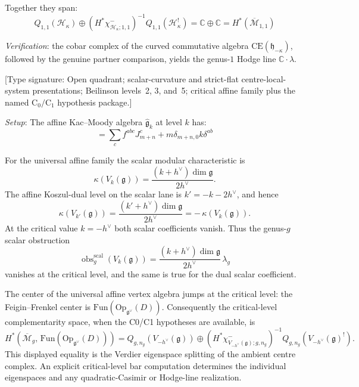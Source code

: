\begin{example}
Together they span:
\begin{equation}
Q_{1,1}(\mathcal{H}_\kappa)\oplus
(H^*\chi^-_{\mathcal H_\kappa;1,1})^{-1}
Q_{1,1}(\mathcal{H}_\kappa^!)=\mathbb{C}\oplus\mathbb{C}
= H^*(\overline{\mathcal{M}}_{1,1})
\end{equation}

\emph{Verification}: the cobar complex of the curved commutative
algebra $\mathrm{CE}(\mathfrak h_{-\kappa})$, followed by the genuine
partner comparison, yields the genus-$1$ Hodge line
$\mathbb C\cdot\lambda$.
\end{example}

\begin{example}
\label{ex:kac-moody-complementarity-explicit}
\textup{[Type signature: Open quadrant; scalar-curvature and
strict-flat centre-local-system presentations; Beilinson levels~2,
3, and~5; critical affine family plus the named
\(\mathrm C_0/\mathrm C_1\) hypothesis package.]}

\emph{Setup}: The affine Kac--Moody algebra $\widehat{\mathfrak{g}}_k$ at level $k$
has:
\begin{equation}
[J^a_m, J^b_n] = \sum_c f^{abc} J^c_{m+n} + m\delta_{m+n,0} k \delta^{ab}
\end{equation}

For the universal affine family the scalar modular characteristic is
\[
\kappa(V_k(\mathfrak g))
=
\frac{(k+h^\vee)\dim\mathfrak g}{2h^\vee}.
\]
The affine Koszul-dual level on the scalar lane is
$k'=-k-2h^\vee$, and hence
\[
\kappa(V_{k'}(\mathfrak g))
=
\frac{(k'+h^\vee)\dim\mathfrak g}{2h^\vee}
=
-\,\kappa(V_k(\mathfrak g)).
\]
At the critical value $k=-h^\vee$ both scalar coefficients vanish.
Thus the genus-$g$ scalar obstruction
\[
\operatorname{obs}^{\mathrm{scal}}_g(V_k(\mathfrak g))
=
\frac{(k+h^\vee)\dim\mathfrak g}{2h^\vee}\,\lambda_g
\]
vanishes at the critical level, and the same is true for the dual
scalar coefficient.

The center of the universal affine vertex algebra jumps at the
critical level: the Feigin--Frenkel center is
$\mathrm{Fun}(\mathrm{Op}_{\mathfrak g^\vee}(D))$. Consequently the
critical-level complementarity space, when the C0/C1 hypotheses are
available, is
\[
H^*\!\left(
\overline{\mathcal M}_g,\,
\mathrm{Fun}(\mathrm{Op}_{\mathfrak g^\vee}(D))
\right)
=
Q_{g,n_g}(V_{-h^\vee}(\mathfrak g))
\oplus
(H^*\chi^-_{V_{-h^\vee}(\mathfrak g);g,n_g})^{-1}
Q_{g,n_g}(V_{-h^\vee}(\mathfrak g)^!).
\]
This displayed equality is the Verdier eigenspace splitting of the
ambient centre complex.  An explicit critical-level bar computation
determines the individual eigenspaces and any quadratic-Casimir or
Hodge-line realization.


\end{example}
